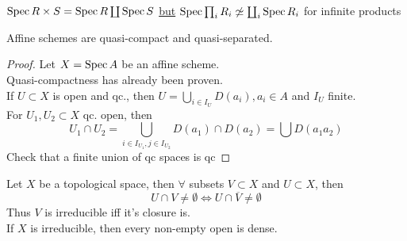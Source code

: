 \documentclass[../main.tex]{subfiles}
\begin{document}
\begin{rmq}
	$\operatorname{Spec} R\times S= \operatorname{Spec} R \coprod \operatorname{Spec} S$ \underline{but} 
	$\operatorname{Spec} \prod_i R_i\not\simeq \coprod_i \operatorname{Spec} R_i$ for infinite products
\end{rmq}
\begin{lemma}
Affine schemes are quasi-compact and quasi-separated.
\end{lemma}
\begin{proof}
Let $X= \operatorname{Spec} A$ be an affine scheme.\\
Quasi-compactness has already been proven.\\
If $U \subset X$ is open and qc., then $U = \bigcup_{i \in I_U} D( a_i), a_i \in A $ and $I_U $ finite.\\
For $U_1,U_2 \subset X$ qc. open, then
\[ 
U_1\cap U_2 = \bigcup_{i \in I_{U_1} , j \in I_{U_2} } D( a_1) \cap D( a_2) = \bigcup D( a_1a_2) 
\]
Check that a finite union of qc spaces is qc
\end{proof}
\begin{rmq}
Let $X$ be a topological space, then $\forall $ subsets $V \subset X$ and $U \subset X$, then
\[ 
U\cap V \neq \emptyset \iff U \cap \overline{V} \neq \emptyset
\]
Thus $V$ is irreducible iff it's closure is.\\

If $X$ is irreducible, then every non-empty open is dense.
\end{rmq}
\end{document}
